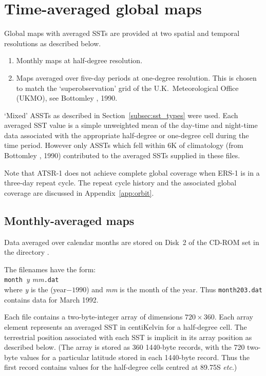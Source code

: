 \clearpage

\section{Time-averaged global maps}
\label{sec:time}


Global maps with averaged SSTs are provided at two spatial 
and temporal resolutions as described below.

\begin{enumerate}
\item Monthly maps at half-degree resolution. 

\item Maps averaged  over five-day periods at one-degree resolution.
This is chosen to match the `superobservation' grid of the 
U.K.~Meteorological Office (UKMO), see Bottomley \etal, 1990.

\end{enumerate}

`Mixed' ASSTs  as described in Section~\ref{subsec:sst_types} were used.
Each averaged SST value is a simple unweighted mean of the day-time 
and night-time data associated with the appropriate half-degree or 
one-degree cell during the time period.
However only ASSTs which fell within 6K of climatology
(from Bottomley \etal, 1990)
contributed  to the averaged SSTs supplied in  these files.


Note that ATSR-1 does not achieve complete global coverage when ERS-1
is in a three-day repeat cycle. The repeat cycle history and the associated
global coverage are discussed in Appendix~\ref{app:orbit}.

\subsection{Monthly-averaged maps}
\label{subsec:month}

Data averaged over calendar months are 
stored on Disk~2 of the CD-ROM set in the directory
.

The filenames have the form:\\
\hspace*{2cm} {\tt month }{\sl y mm}{\tt.dat}\\
where {\sl y} is the (year$-1990$) and {\sl mm} is the month of the year.
Thus {\tt month203.dat} contains data for March 1992.

Each file contains a two-byte-integer array of dimensions $720\times360$.
Each array element represents an averaged  SST  in centiKelvin for a 
half-degree cell.
The terrestrial position associated with each SST is implicit in its 
array position as described below.
(The array is stored as 360 1440-byte records, with the 720 two-byte values
for a particular latitude stored in each 1440-byte record. 
Thus the first record contains values for the  half-degree cells
centred at 89.75{\degree}S {\sl etc}.)


